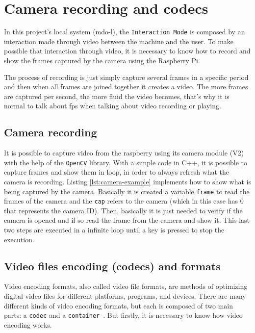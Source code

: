 %
\section{Camera recording and codecs}
\label{sec:camera-record-codecs}

In this project's local system (\gls{mdo-l}), the \texttt{Interaction Mode} is composed by an interaction made through video between the machine and the user.
To make possible that interaction through video, it is necessary to know how to record and show the frames captured by the camera using the Raspberry Pi. 

The process of recording is just simply capture several frames in a specific period and then when all frames are joined together it creates a video.
The more frames are captured per second, the more fluid the video becomes, that's why it is normal to talk about \gls{fps} when talking about video recording or playing.

\subsection{Camera recording}
\label{sub-sec:camera-record}
It is possible to capture video from the raspberry using its camera module (V2) with the help of the \texttt{OpenCV} library.
With a simple code in C++, it is possible to capture frames and show them in loop, in order to always refresh what the camera is recording.
Listing \ref{lst:camera-example} implements how to show what is being captured by the camera. Basically it is created a variable \texttt{frame} to read the frames of the camera and the \texttt{cap} refers to the camera (which in this case has 0 that represents the camera ID).
Then, basically it is just needed to verify if the camera is opened and if so read the frame from the camera and show it. This last two steps are executed in a infinite loop until a key is pressed to stop the execution. 
%


\subsection{Video files encoding (codecs) and formats}
\label{sub-sec:codecs-and-formats}
Video encoding formats, also called video file formats, are methods of optimizing digital video files for different platforms, programs, and devices.
There are many different kinds of video encoding formats, but each is composed of two main parts: a \texttt{codec} and a \texttt{container}~\cite{video-encoding}. But firstly, it is necessary to know how video encoding works.

